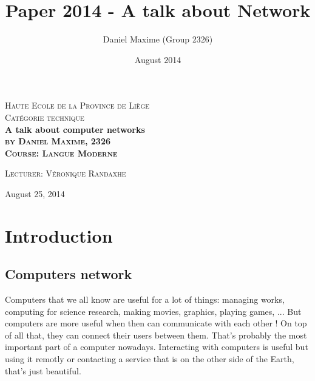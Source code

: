 \documentclass{article}
\title{Paper 2014 - A talk about Network}
\author{Daniel Maxime (Group 2326)}
\date{August 2014}
\begin{document}
\begin{titlepage}
\begin{center}
\textsc{\LARGE Haute Ecole de la Province de Liège}\\[0.5cm]
\textsc{\Large Catégorie technique}\\[4cm]

\huge \bfseries A talk about computer networks \\
\textsc{\Large by Daniel Maxime, 2326}\\[2cm]



\textsc{\large Course: Langue Moderne}

\textsc{\large Lecturer: Véronique Randaxhe}

\vfill
{\large August 25, 2014}

\end{center}
\end{titlepage}
\newpage

\tableofcontents
\clearpage

%
% 
% 
% 
%


\section{Introduction}

	\subsection{Computers network}
	
	Computers that we all know are useful for a lot of things: managing works, computing for science research,
	making movies, graphics, playing games, ... But computers are more useful when then can communicate with each other !
	On top of all that, they can connect their users between them. That's probably the most important part of a
	computer nowadays. Interacting with computers is useful but using it remotly or contacting a service that
	is on the other side of the Earth, that's just beautiful.
	
\end{document}

